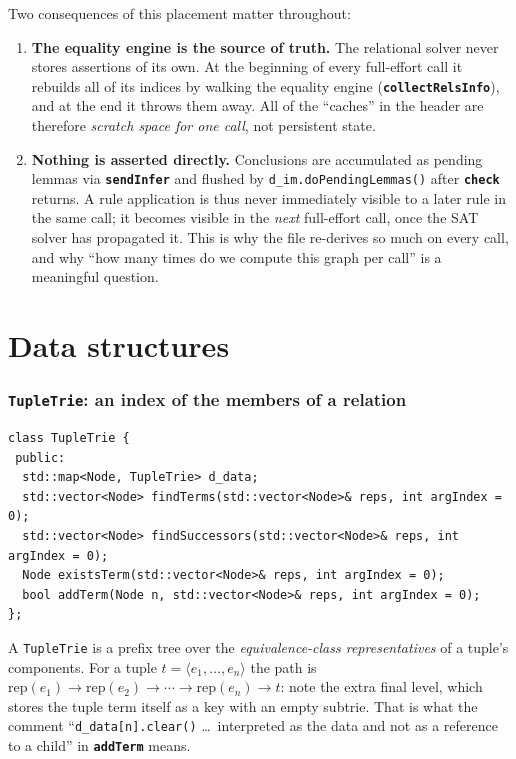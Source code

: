 \documentclass[11pt,a4paper]{article}
\newcommand{\code}[1]{\texttt{\small #1}}
\newcommand{\fn}[1]{\texttt{\small\bfseries #1}}
\newcommand{\tup}[1]{\langle #1 \rangle}
\newcommand{\rep}[1]{\mathrm{rep}(#1)}
\theoremstyle{definition}
\begin{document}
\noindent
Two consequences of this placement matter throughout:

\begin{enumerate}[leftmargin=*,itemsep=2pt]
\item \textbf{The equality engine is the source of truth.} The relational
  solver never stores assertions of its own. At the beginning of every
  full-effort call it rebuilds all of its indices by walking the equality
  engine (\fn{collectRelsInfo}), and at the end it throws them away. All of the
  ``caches'' in the header are therefore \emph{scratch space for one call}, not
  persistent state.
\item \textbf{Nothing is asserted directly.} Conclusions are accumulated as
  pending lemmas via \fn{sendInfer} and flushed by
  \code{d\_im.doPendingLemmas()} after \fn{check} returns. A rule application
  is thus never immediately visible to a later rule in the same call; it
  becomes visible in the \emph{next} full-effort call, once the SAT solver has
  propagated it. This is why the file re-derives so much on every call, and why
  ``how many times do we compute this graph per call'' is a meaningful
  question.
\end{enumerate}

\part{Data structures}\label{part:ds}

\section{\code{TupleTrie}: an index of the members of a relation}

\begin{lstlisting}
class TupleTrie {
 public:
  std::map<Node, TupleTrie> d_data;
  std::vector<Node> findTerms(std::vector<Node>& reps, int argIndex = 0);
  std::vector<Node> findSuccessors(std::vector<Node>& reps, int argIndex = 0);
  Node existsTerm(std::vector<Node>& reps, int argIndex = 0);
  bool addTerm(Node n, std::vector<Node>& reps, int argIndex = 0);
};
\end{lstlisting}

\noindent
A \code{TupleTrie} is a prefix tree over the \emph{equivalence-class
representatives} of a tuple's components. For a tuple
$t = \tup{e_1,\dots,e_n}$ the path is
$\rep{e_1}\to\rep{e_2}\to\cdots\to\rep{e_n}\to t$: note the extra final level,
which stores the tuple term itself as a key with an empty subtrie. That is what
the comment ``\code{d\_data[n].clear()} \dots\ interpreted as the data and not
as a reference to a child'' in \fn{addTerm} means.
\end{document}
